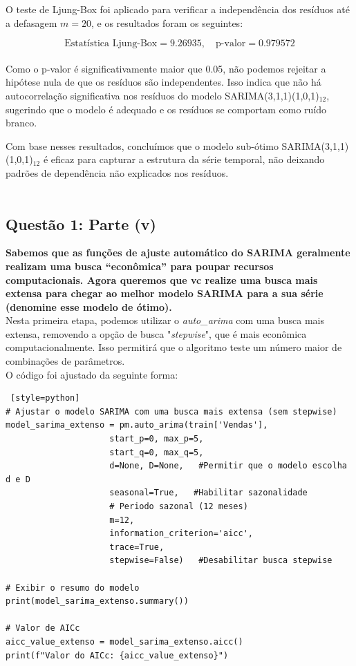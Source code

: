 \documentclass[a4paper, 12pt]{article}
\begin{document}
O teste de Ljung-Box foi aplicado para verificar a independência dos resíduos até a defasagem \(m=20\), e os resultados foram os seguintes:

\[
\text{Estatística Ljung-Box} = 9.26935, \quad \text{p-valor} = 0.979572
\] \\

Como o p-valor é significativamente maior que 0.05, não podemos rejeitar a hipótese nula de que os resíduos são independentes. Isso indica que não há autocorrelação significativa nos resíduos do modelo SARIMA(3,1,1)(1,0,1)$_{12}$, sugerindo que o modelo é adequado e os resíduos se comportam como ruído branco.

Com base nesses resultados, concluímos que o modelo sub-ótimo SARIMA(3,1,1)(1,0,1)$_{12}$ é eficaz para capturar a estrutura da série temporal, não deixando padrões de dependência não explicados nos resíduos.\\\\

\subsection{Questão 1: Parte (v)}
\textbf{Sabemos que as funções de ajuste automático do SARIMA geralmente realizam uma busca
“econômica” para poupar recursos computacionais. Agora queremos que vc realize uma busca
mais extensa para chegar ao melhor modelo SARIMA para a sua série (denomine esse modelo
de ótimo).}\\

Nesta primeira etapa, podemos utilizar o \textit{auto\_arima} com uma busca mais extensa, removendo a opção de busca "\textit{stepwise}", que é mais econômica computacionalmente. Isso permitirá que o algoritmo teste um número maior de combinações de parâmetros.\\

O código foi ajustado da seguinte forma:\\

\begin{lstlisting} [style=python]
# Ajustar o modelo SARIMA com uma busca mais extensa (sem stepwise)
model_sarima_extenso = pm.auto_arima(train['Vendas'],
                     start_p=0, max_p=5,
                     start_q=0, max_q=5,
                     d=None, D=None,   #Permitir que o modelo escolha d e D
                     seasonal=True,   #Habilitar sazonalidade
                     # Periodo sazonal (12 meses)
                     m=12,
                     information_criterion='aicc',
                     trace=True,
                     stepwise=False)   #Desabilitar busca stepwise

# Exibir o resumo do modelo
print(model_sarima_extenso.summary())

# Valor de AICc
aicc_value_extenso = model_sarima_extenso.aicc()
print(f"Valor do AICc: {aicc_value_extenso}")
\end{lstlisting}
\end{document}
